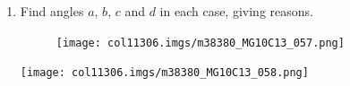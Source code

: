 \begin{table}[H]
\begin{enumerate}[noitemsep,
label=\textbf{\arabic*}. ]
    
        
        \label{m38380*uid116}\item Find angles \begin{math}a\end{math},
\begin{math}b\end{math}, \begin{math}c\end{math} and \begin{math}d\end{math} in
each case, giving reasons.
    \setcounter{subfigure}{0}


	\begin{figure}[H] %
    \begin{center}
   
\label{m38380*id320271!!!underscore!!!media}\label{
m38380*id320271!!!underscore!!!printimage}\texttt{[image: 
col11306.imgs/m38380\_MG10C13\_057.png]} %
        
    
    \end{center}

 \end{figure}   

    \addtocounter{footnote}{-0}


\label{m38380*id320290!!!underscore!!!media}\label{
m38380*id320290!!!underscore!!!printimage}\texttt{[image: 
col11306.imgs/m38380\_MG10C13\_058.png]} %
        
    


\end{enumerate}
\end{table}

